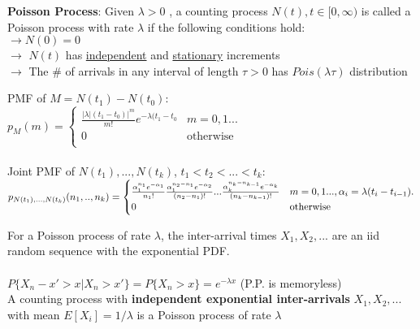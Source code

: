 \documentclass{article}
\begin{document}
	\textbf{Poisson Process}: Given $\lambda > 0$ , a counting process $N(t), t \in [0, \infty)$ is called a Poisson process with rate $\lambda$ if the following conditions hold:\\
    $\to N(0) = 0$\\
    $\to$ $N(t)$ has \underline{independent} and \underline{stationary} increments \\ 
	$\to$ The \# of arrivals in any interval of length $\tau > 0$ has $Pois(\lambda\tau)$ distribution\\
	\begin{multicols}{2}
    PMF of $M = N(t_1) - N(t_0)$:\\
    $p_M(m) = \begin{cases} \frac{\vert\lambda \vert(t_1 - t_0)\vert^m}{m!}e^{-\lambda(t_1 - t_0} & m = 0, 1... \\ 0 &  \text{otherwise} \\ \end{cases}$\\\\
    
    Joint PMF of $N(t_1), ..., N(t_k)$, $t_1 < t_2 < ... < t_k$:\\
    $p_{N(t_1), ..., N(t_k)}(n_1, .., n_k)\\ = \begin{cases} \frac{\alpha_1^{n_1}e^{-\alpha_1}}{n_1!}\frac{\alpha_1^{n_2 - n_1}e^{-\alpha_2}}{(n_2 - n_1)!}...\frac{\alpha_k^{n_k- n_{k - 1}}e^{-\alpha_k}}{(n_k - n_{k-1})!} & m = 0, 1..., \alpha_i = \lambda(t_i - t_{i - 1}).\\ 0 &  \text{otherwise}\\ \end{cases}$
    \end{multicols}
	For a Poisson process of rate $\lambda$, the inter-arrival times $X_1, X_2, ...$ are an iid random sequence with the exponential PDF. \\
	\\
	$P\{X_n - x' > x \vert X_n > x'\} = P\{X_n > x\} = e^{-\lambda x}$ (P.P. is memoryless)  
	\\
	A counting process with \textbf{independent exponential inter-arrivals} $X_1, X_2, ...$ with mean $E[X_i] = 1/\lambda$ is a Poisson process of rate $\lambda$
	\\
	
\end{document}
